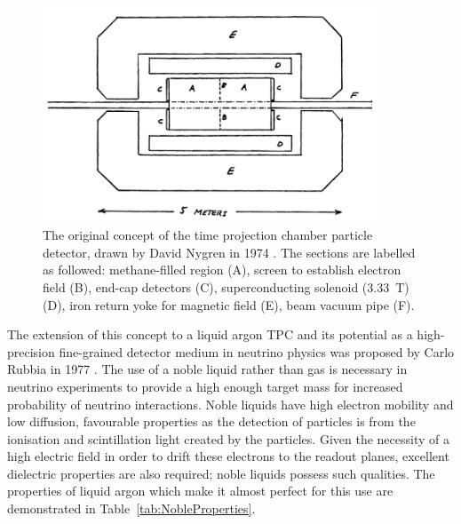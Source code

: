 \begin{figure}
  \centering
  \includegraphics[width=10cm]{NygrenTPC.png}
  \caption[The original concept of the time projection chamber particle detector, drawn by David Nygren in 1974.]{The original concept of the time projection chamber particle detector, drawn by David Nygren in 1974 \cite{Nygren1974}.  The sections are labelled as followed: methane-filled region (A), screen to establish electron field (B), end-cap detectors (C), superconducting solenoid (3.33~T) (D), iron return yoke for magnetic field (E), beam vacuum pipe (F).}
  \label{fig:NygrenTPC}
\end{figure}

The extension of this concept to a liquid argon TPC and its potential as a high-precision fine-grained detector medium in neutrino physics was proposed by Carlo Rubbia in 1977 \cite{Rubbia1977}.  The use of a noble liquid rather than gas is necessary in neutrino experiments to provide a high enough target mass for increased probability of neutrino interactions.  Noble liquids have high electron mobility and low diffusion, favourable properties as the detection of particles is from the ionisation and scintillation light created by the particles.  Given the necessity of a high electric field in order to drift these electrons to the readout planes, excellent dielectric properties are also required; noble liquids possess such qualities.  The properties of liquid argon which make it almost perfect for this use are demonstrated in Table~\ref{tab:NobleProperties}.

